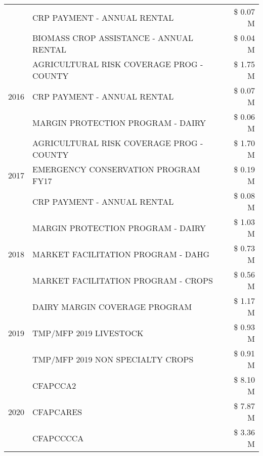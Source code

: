 \begin{tabular}{llr}
 & CRP PAYMENT - ANNUAL RENTAL & \$ 0.07 M \\
 & BIOMASS CROP ASSISTANCE - ANNUAL RENTAL & \$ 0.04 M \\
\cline{1-3}
\multirow[t]{3}{*}{2016} & AGRICULTURAL RISK COVERAGE PROG - COUNTY & \$ 1.75 M \\
 & CRP PAYMENT - ANNUAL RENTAL & \$ 0.07 M \\
 & MARGIN PROTECTION PROGRAM - DAIRY & \$ 0.06 M \\
\cline{1-3}
\multirow[t]{3}{*}{2017} & AGRICULTURAL RISK COVERAGE PROG - COUNTY & \$ 1.70 M \\
 & EMERGENCY CONSERVATION PROGRAM FY17 & \$ 0.19 M \\
 & CRP PAYMENT - ANNUAL RENTAL & \$ 0.08 M \\
\cline{1-3}
\multirow[t]{3}{*}{2018} & MARGIN PROTECTION PROGRAM - DAIRY & \$ 1.03 M \\
 & MARKET FACILITATION PROGRAM - DAHG & \$ 0.73 M \\
 & MARKET FACILITATION PROGRAM - CROPS & \$ 0.56 M \\
\cline{1-3}
\multirow[t]{3}{*}{2019} & DAIRY MARGIN COVERAGE PROGRAM & \$ 1.17 M \\
 & TMP/MFP 2019 LIVESTOCK & \$ 0.93 M \\
 & TMP/MFP 2019 NON SPECIALTY CROPS & \$ 0.91 M \\
\cline{1-3}
\multirow[t]{3}{*}{2020} & CFAPCCA2 & \$ 8.10 M \\
 & CFAPCARES & \$ 7.87 M \\
 & CFAPCCCCA & \$ 3.36 M \\
\cline{1-3}
\bottomrule
\end{tabular}
